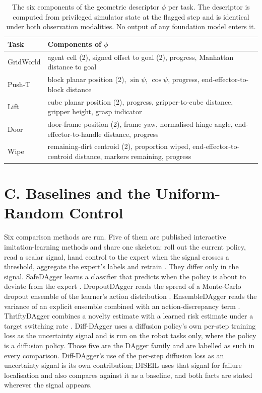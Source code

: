 \documentclass[letterpaper]{article}
\begin{document}
\begin{table}[t]
\centering
\caption{The six components of the geometric descriptor $\phi$ per task. The
descriptor is computed from privileged simulator state at the flagged step and is
identical under both observation modalities. No output of any foundation model enters
it.}
\label{tab:descriptor}
\begin{tabular}{l>{\raggedright\arraybackslash}p{4.7cm}}
\toprule
Task & Components of $\phi$ \\
\midrule
GridWorld & agent cell (2), signed offset to goal (2), progress, Manhattan distance to goal \\
Push-T & block planar position (2), $\sin\psi$, $\cos\psi$, progress, end-effector-to-block distance \\
Lift & cube planar position (2), progress, gripper-to-cube distance, gripper height, grasp indicator \\
Door & door-frame position (2), frame yaw, normalised hinge angle, end-effector-to-handle distance, progress \\
Wipe & remaining-dirt centroid (2), proportion wiped, end-effector-to-centroid distance, markers remaining, progress \\
\bottomrule
\end{tabular}
\end{table}

\section{C. Baselines and the Uniform-Random Control}

Six comparison methods are run. Five of them are published interactive
imitation-learning methods and share one skeleton: roll out the current policy, read a
scalar signal, hand control to the expert when the signal crosses a threshold,
aggregate the expert's labels and retrain \citep{ross2011dagger}. They differ only in
the signal. SafeDAgger learns a classifier that predicts when the policy is about to
deviate from the expert \citep{zhang2017safedagger}. DropoutDAgger reads the spread of
a Monte-Carlo dropout ensemble of the learner's action distribution
\citep{gal2016dropout, menda2017dropoutdagger}. EnsembleDAgger reads the variance of an
explicit ensemble combined with an action-discrepancy term
\citep{lakshminarayanan2017ensembles, menda2019ensembledagger}. ThriftyDAgger combines
a novelty estimate with a learned risk estimate under a target switching rate
\citep{hoque2021thriftydagger}. Diff-DAgger uses a diffusion policy's own per-step
training loss as the uncertainty signal \citep{lee2025diffdagger} and is run on the
robot tasks only, where the policy is a diffusion policy. Those five are the DAgger
family and are labelled as such in every comparison. Diff-DAgger's use of the per-step
diffusion loss as an uncertainty signal is its own contribution; DISEIL uses that
signal for failure localisation and also compares against it as a baseline, and both
facts are stated wherever the signal appears.
\end{document}
